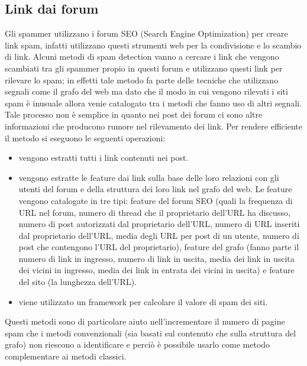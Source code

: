 \subsection{Link dai forum}
Gli spammer utilizzano i forum SEO (Search Engine Optimization) per creare link spam, infatti utilizzano questi strumenti web per la condivisione e lo scambio di link. Alcuni metodi di spam detection vanno a cercare i link che vengono scambiati tra gli spammer propio in questi forum \cite{Cheng:2011:LWS:1935826.1935902} e utilizzano questi link per rilevare lo spam; in effetti tale metodo fa parte delle tecniche che utilizzano segnali come il grafo del web ma dato che il modo in cui vengono rilevati i siti spam è inusuale allora venie catalogato tra i metodi che fanno uso di altri segnali. Tale processo non è semplice in quanto nei post dei forum ci sono altre informazioni che producono rumore nel rilevamento dei link. Per rendere efficiente il metodo si eseguono le seguenti operazioni:
\begin{itemize}
 \item vengono estratti tutti i link contenuti nei post.
 \item vengono estratte le feature dai link sulla base delle loro relazioni con gli utenti del forum e della struttura dei loro link nel grafo del web. Le feature vengono catalogate in tre tipi: feature del forum SEO (quali la frequenza di URL nel forum, numero di thread che il proprietario dell'URL ha discusso, numero di post autorizzati dal proprietario dell'URL, numero di URL inseriti dal proprietario dell'URL, media degli URL per post di un utente, numero di post che contengono l'URL del proprietario), feature del grafo (fanno parte il numero di link in ingresso, numero di link in uscita, media dei link in uscita dei vicini in ingresso, media dei link in entrata dei vicini in uscita) e feature del sito (la lunghezza dell'URL). 
 \item viene utilizzato un framework per calcolare il valore di spam dei siti.
\end{itemize}
Questi metodi sono di particolare aiuto nell'incrementare il numero di pagine spam che i metodi convenzionali (sia basati sul contenuto che sulla struttura del grafo) non riescono a identificare  e perciò è possibile usarlo come metodo complementare ai metodi classici.

